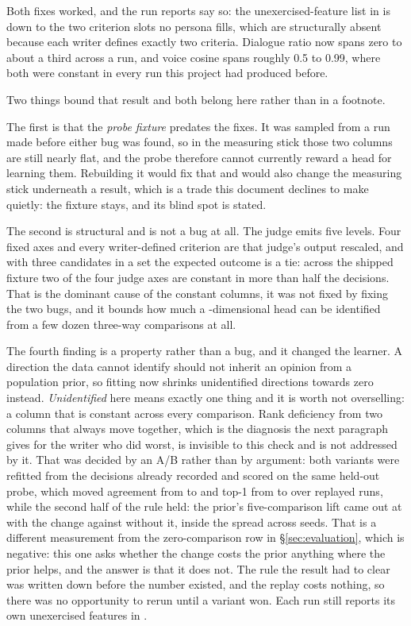 \documentclass{article}
\newcommand{\file}[1]{\texttt{\small\detokenize{#1}}}
\begin{document}
Both fixes worked, and the run reports say so: the unexercised-feature list in
\file{summary.md} is down to the two criterion slots no persona fills, which are structurally
absent because each writer defines exactly two criteria. Dialogue ratio now spans zero to
about a third across a run, and voice cosine spans roughly 0.5 to 0.99, where both were
constant in every run this project had produced before.

Two things bound that result and both belong here rather than in a footnote.

The first is that the \emph{probe fixture} predates the fixes. It was sampled from a run made
before either bug was found, so in the measuring stick those two columns are still nearly
flat, and the probe therefore cannot currently reward a head for learning them. Rebuilding it
would fix that and would also change the measuring stick underneath a result, which is a
trade this document declines to make quietly: the fixture stays, and its blind spot is stated.

The second is structural and is not a bug at all. The judge emits five levels. Four fixed axes
and every writer-defined criterion are that judge's output rescaled, and with three candidates
in a set the expected outcome is a tie: across the shipped fixture two of the four judge axes
are constant in more than half the decisions. That is the dominant cause of the constant
columns, it was not fixed by fixing the two bugs, and it bounds how much a
\rFeatures{}-dimensional head can be identified from a few dozen three-way comparisons at
all.

The fourth finding is a property rather than a bug, and it changed the learner. A direction
the data cannot identify should not inherit an opinion from a population prior, so fitting
now shrinks unidentified directions towards zero instead. \emph{Unidentified} here means
exactly one thing and it is worth not overselling: a column that is constant across every
comparison. Rank deficiency from two columns that always move together, which is the
diagnosis the next paragraph gives for the writer who did worst, is invisible to this check
and is not addressed by it. That was decided by an A/B rather
than by argument: both variants were refitted from the decisions already recorded and
scored on the same held-out probe, which moved agreement from \rShrinkTauAnchored{} to
\rShrinkTauShrunk{} and top-1 from \rShrinkTopOneAnchored{} to \rShrinkTopOneShrunk{} over
\rShrinkRunsReplayed{} replayed runs, while the second half of the rule held: the prior's
five-comparison lift came out at \rShrinkColdStartShrunk{} with the change against
\rShrinkColdStartAnchored{} without it, inside the \rShrinkColdStartSeedSd{} spread across
\rShrinkColdStartSeeds{} seeds. That is a different measurement from the zero-comparison row
in \S\ref{sec:evaluation}, which is negative: this one asks whether the change costs the
prior anything where the prior helps, and the answer is that it does not. The rule the result had to clear was written down before the number existed,
and the replay costs nothing, so there was no opportunity to rerun until a variant won. Each run still reports
its own unexercised features in \file{summary.md}.
\end{document}
